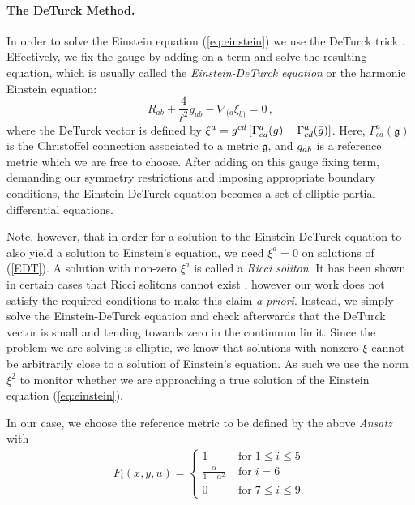 \documentclass[%
 reprint,
 amsmath,amssymb,
 aps,
]{revtex4-2}
\begin{document}
\paragraph{The DeTurck Method.}
In order to solve the Einstein equation (\ref{eq:einstein}) we use the DeTurck trick \cite{Headrick:2009pv,Wiseman:2011by,Dias:2015nua}. Effectively, we fix the gauge by adding on a term and solve the resulting equation, which is usually called the \textit{Einstein-DeTurck equation} or the harmonic Einstein equation:
\begin{equation}\label{EDT}
    R_{ab}+\frac{4}{\ell^2}g_{ab} - \nabla_{(a}\xi_{b)} = 0\,,
\end{equation}
where the DeTurck vector is defined by $\xi^a = g^{cd}\left[\Gamma^a_{cd}(g)-\Gamma^a_{cd}(\Bar{g})\right]$. Here, $\Gamma^a_{cd}(\mathfrak{g})$ is the Christoffel connection associated to a metric $\mathfrak{g}$, and $\Bar{g}_{ab}$ is a reference metric which we are free to choose. After adding on this gauge fixing term, demanding our symmetry restrictions and imposing appropriate boundary conditions, the Einstein-DeTurck equation becomes a set of elliptic partial differential equations.

Note, however, that in order for a solution to the Einstein-DeTurck equation to also yield a solution to Einstein's equation, we need $\xi^a = 0$ on solutions of (\ref{EDT}). A solution with non-zero $\xi^a$ is called a \textit{Ricci soliton}. It has been shown in certain cases that Ricci solitons cannot exist \cite{Figueras:2011va,Figueras:2016nmo}, however our work does not satisfy the required conditions to make this claim \textit{a priori}. Instead, we simply solve the Einstein-DeTurck equation and check afterwards that the DeTurck vector is small and tending towards zero in the continuum limit. Since the problem we are solving is elliptic, we know that solutions with nonzero $\xi$ cannot be arbitrarily close to a solution of Einstein's equation. As such we use the norm $\xi^2$ to monitor whether we are approaching a true solution of the Einstein equation (\ref{eq:einstein}).

In our case, we choose the reference metric to be defined by the above \emph{Ansatz} with
\begin{eqnarray}\label{reference}
    F_i(x,y,u) = \begin{cases}
1 \quad &\text{for}\; 1\leq i \leq 5\\
\frac{\alpha}{1+\alpha^2}\;&\text{for}\; i=6\\
0 \quad &\text{for}\; 7\leq i \leq 9.
\end{cases}
\end{eqnarray}
\end{document}
